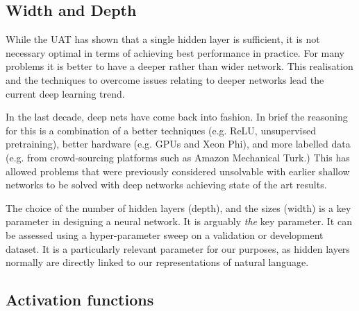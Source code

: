 \documentclass[12pt,parskip]{komatufte}
\begin{document}
\subsection{Width and Depth}
While the UAT has shown that a single hidden layer is sufficient,
it is not necessary optimal in terms of achieving best performance in practice.
For many problems it is better to have a deeper rather than wider network.
This realisation and the techniques to overcome issues relating to deeper networks lead the current deep learning trend.



In the last decade, deep nets have come back into fashion.
In brief the reasoning for this is a combination of a better techniques (e.g. ReLU, unsupervised pretraining),
better hardware (e.g. GPUs and Xeon Phi), and more labelled data (e.g. from crowd-sourcing platforms such as Amazon Mechanical Turk.)
This has allowed problems that were previously considered unsolvable with earlier shallow networks to be solved with deep networks achieving state of the art results.


The choice of the number of hidden layers (depth),
and the sizes (width) is a key parameter in designing a neural network.
It is arguably \emph{the} key parameter.
It can be assessed using a hyper-parameter sweep on a validation or development dataset.
It is a particularly relevant parameter for our purposes, as hidden layers normally are directly linked to our representations of natural language.





\subsection{Activation functions}
\end{document}
